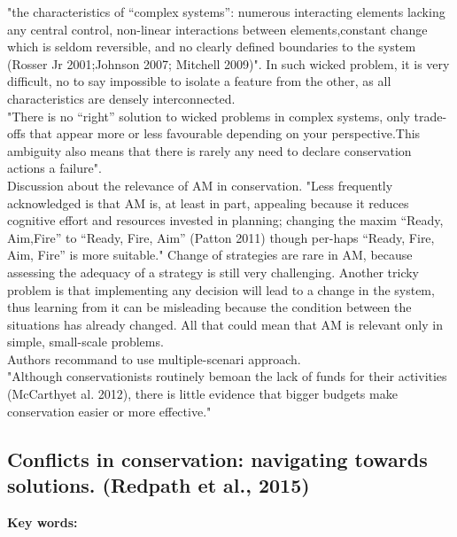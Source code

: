 \documentclass[12pt]{article}
\begin{document}
"the characteristics of “complex systems”: numerous interacting elements lacking any central control, non-linear interactions between elements,constant change which is seldom reversible, and no clearly defined boundaries to the system (Rosser Jr 2001;Johnson 2007; Mitchell 2009)". In such wicked problem, it is very difficult, no to say impossible to isolate a feature from the other, as all characteristics are densely interconnected.\\
"There is no “right” solution to wicked problems in complex systems, only trade-offs that appear more or less favourable depending on your perspective.This ambiguity also means that there is rarely any need to declare conservation actions a failure".\\
Discussion about the relevance of AM in conservation.
"Less frequently acknowledged is that AM is, at least in part, appealing because it reduces cognitive effort and resources invested in planning; changing the maxim “Ready, Aim,Fire” to “Ready, Fire, Aim” (Patton 2011) though per-haps “Ready, Fire, Aim, Fire” is more suitable." 
Change of strategies are rare in AM, because assessing the adequacy of a strategy is still very challenging.
Another tricky problem is that implementing any decision will lead to a change in the system, thus learning from it can be misleading because the condition between the situations has already changed.
All that could mean that AM is relevant only in simple, small-scale problems.\\
Authors recommand to use multiple-scenari approach.\\
"Although conservationists routinely bemoan the lack of funds for their activities (McCarthyet  al. 2012), there is little evidence that bigger budgets make conservation easier or more effective."


\subsection{Conflicts in conservation: navigating towards solutions. (Redpath et al., 2015)}
\textbf{Key words:}\\
\end{document}
